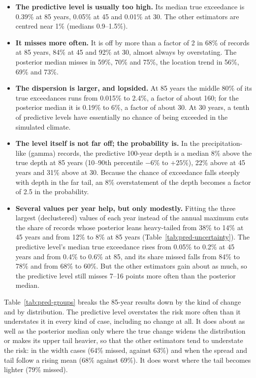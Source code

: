 \documentclass[11pt]{article}
\begin{document}
\begin{itemize}
\item \textbf{The predictive level is usually too high.} Its median true exceedance is 0.39\% at 85
  years, 0.05\% at 45 and 0.01\% at 30. The other estimators are centred near 1\% (medians 0.9--1.5\%).
\item \textbf{It misses more often.} It is off by more than a factor of 2 in 68\% of records at
  85 years, 84\% at 45 and 92\% at 30, almost always by overstating. The posterior median misses in
  59\%, 70\% and 75\%, the location trend in 56\%, 69\% and 73\%.
\item \textbf{The dispersion is larger, and lopsided.} At 85 years the middle 80\% of its true
  exceedances runs from 0.015\% to 2.4\%, a factor of about 160; for the posterior median it is 0.19\%
  to 6\%, a factor of about 30. At 30 years, a tenth of predictive levels have essentially no chance of
  being exceeded in the simulated climate.
\item \textbf{The level itself is not far off; the probability is.} In the precipitation-like
  (gamma) records, the predictive 100-year depth is a median 8\% above the true depth at 85 years
  (10--90th percentile $-6\%$ to $+25\%$), 22\% above at 45 years and 31\% above at 30. Because the
  chance of exceedance falls steeply with depth in the far tail, an 8\% overstatement of the depth
  becomes a factor of 2.5 in the probability.
\item \textbf{Several values per year help, but only modestly.} Fitting the three largest
  (declustered) values of each year instead of the annual maximum cuts the share of records whose
  posterior leans heavy-tailed from 38\% to 14\% at 45 years and from 12\% to 8\% at 85 years
  (Table~\ref{tab:pred-uncertainty}). The predictive level's median true exceedance rises from 0.05\% to
  0.2\% at 45 years and from 0.4\% to 0.6\% at 85, and its share missed falls from 84\% to 78\% and
  from 68\% to 60\%. But the other estimators gain about as much, so the predictive level still
  misses 7--16 points more often than the posterior median.
\end{itemize}

Table~\ref{tab:pred-groups} breaks the 85-year results down by the kind of change and by distribution.
The predictive level overstates the risk more often than it understates it in every kind of case, including no
change at all. It does about as well as the posterior median only where the true change widens the
distribution or makes its upper tail heavier, so that the other estimators tend to understate the
risk: in the width cases (64\% missed, against 63\%) and when the spread and tail follow a rising
mean (68\% against 69\%). It does worst where the tail becomes lighter (79\% missed).
\end{document}
